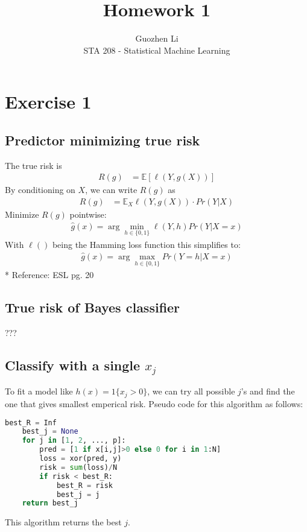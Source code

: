 \documentclass[12pt]{article}
\begin{document}
 
 
 
\title{Homework 1}%
\author{Guozhen Li\\ %
STA 208 - Statistical Machine Learning} %
 
\maketitle


\section{Exercise 1}
\subsection{Predictor minimizing true risk}
The true risk is
\begin{align*}
	R(g) & = \mathbb{E}[\ell(Y,g(X))]
\end{align*}
By conditioning on $X$, we can write $R(g)$ as
\begin{align*}
	R(g) & = \mathbb{E}_X \ell(Y, g(X)) \cdot Pr(Y|X)
\end{align*}
Minimize $R(g)$ pointwise:
\begin{align*}
	\hat{g}(x) = \arg\min_{h\in\{0,1\}} \ell(Y, h) Pr(Y|X=x)
\end{align*}
With $\ell()$ being the Hamming loss function this simplifies to:
\begin{align*}
	\hat{g}(x) = \arg\max_{h\in\{0,1\}} Pr(Y=h|X=x)
\end{align*}
* Reference: ESL pg. 20

\subsection{True risk of Bayes classifier}
???

\subsection{Classify with a single $x_j$}
To fit a model like $h(x)=1\{x_j>0\}$,
we can try all possible $j$'s and find the one that gives smallest emperical risk.
Pseudo code for this algorithm as follows:
\begin{lstlisting}[language=Python]
	best_R = Inf
	best_j = None
	for j in [1, 2, ..., p]:
		pred = [1 if x[i,j]>0 else 0 for i in 1:N]
		loss = xor(pred, y)
		risk = sum(loss)/N
		if risk < best_R:
			best_R = risk
			best_j = j
	return best_j
\end{lstlisting}
This algorithm returns the best $j$.
\end{document}
